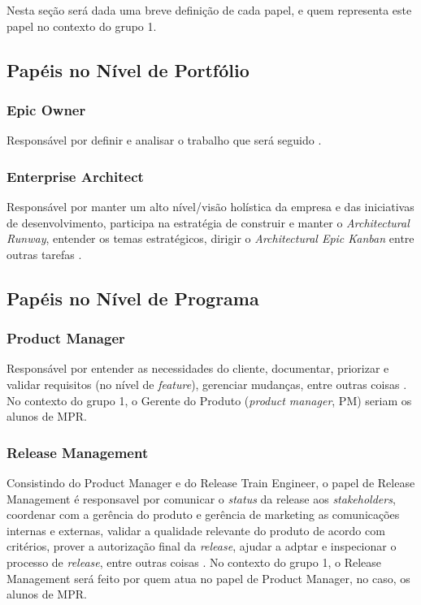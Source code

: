 Nesta seção será dada uma breve definição de cada papel, e quem representa este papel no contexto do grupo 1.

\subsection{Papéis no Nível de Portfólio}
\subsubsection{Epic Owner}
Responsável por definir e analisar o trabalho que será seguido \cite{safe007}.

\subsubsection{Enterprise Architect}
Responsável por manter um alto nível/visão holística da empresa e das iniciativas de desenvolvimento, participa na estratégia de construir e manter o \emph{Architectural Runway}, entender os temas estratégicos, dirigir o \emph{Architectural Epic Kanban} entre outras tarefas \cite{safesite002}.

\subsection{Papéis no Nível de Programa}

\subsubsection{Product Manager}
Responsável por entender as necessidades do cliente, documentar, priorizar e validar requisitos (no nível de \emph{feature}), gerenciar mudanças, entre outras coisas \cite{safe010}. No contexto do grupo 1, o Gerente do Produto (\emph{product manager}, PM) seriam os alunos de MPR.

\subsubsection{Release Management}
Consistindo do Product Manager e do Release Train Engineer, o papel de Release Management é responsavel por comunicar o \emph{status} da release aos \emph{stakeholders}, coordenar com a gerência do produto e gerência de marketing as comunicações internas e externas, validar a qualidade relevante do produto de acordo com critérios, prover a autorização final da \emph{release}, ajudar a adptar e inspecionar o processo de \emph{release}, entre outras coisas \cite{safesite001}.
No contexto do grupo 1, o Release Management será feito por quem atua no papel de Product Manager, no caso, os alunos de MPR.

